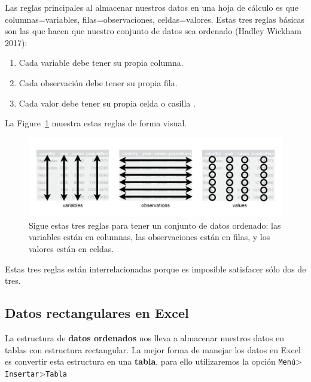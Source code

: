 \documentclass[
  letterpaper,
]{scrbook}
\providecommand{\tightlist}{%
  \setlength{\itemsep}{0pt}\setlength{\parskip}{0pt}}\usepackage{longtable,booktabs,array}
\begin{document}
Las reglas principales al almacenar nuestros datos en una hoja de
cálculo es que columnas=variables, filas=observaciones, celdas=valores.
Estas tres reglas básicas son las que hacen que nuestro conjunto de
datos sea ordenado (Hadley Wickham 2017):

\begin{enumerate}
\def\labelenumi{\arabic{enumi}.}
\tightlist
\item
  Cada variable debe tener su propia columna.
\item
  Cada observación debe tener su propia fila.
\item
  Cada valor debe tener su propia celda o casilla .
\end{enumerate}

La Figure~\ref{fig-tidy1} muestra estas reglas de forma visual.

\begin{figure}

{\centering \includegraphics{./01-imagenes/tidy-1.png}

}

\caption{\label{fig-tidy1}Sigue estas tres reglas para tener un conjunto
de datos ordenado: las variables están en columnas, las observaciones
están en filas, y los valores están en celdas.}

\end{figure}

Estas tres reglas están interrelacionadas porque es imposible satisfacer
sólo dos de tres.

\hypertarget{datos-rectangulares-en-excel}{%
\subsection{Datos rectangulares en
Excel}\label{datos-rectangulares-en-excel}}

La estructura de \textbf{datos ordenados} nos lleva a almacenar nuestros
datos en tablas con estructura rectangular. La mejor forma de manejar
los datos en Excel es convertir esta estructura en una \textbf{tabla},
para ello utilizaremos la opción \texttt{Menú}\textgreater{}
\texttt{Insertar}\textgreater{}\texttt{Tabla}
\end{document}
